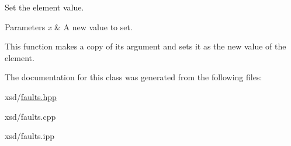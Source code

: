 Set the element value. 


\begin{DoxyParams}{Parameters}
{\em x} & A new value to set.\\
\hline
\end{DoxyParams}
This function makes a copy of its argument and sets it as the new value of the element. 

The documentation for this class was generated from the following files:\begin{DoxyCompactItemize}
\item 
xsd/\hyperlink{faults_8hpp}{faults.hpp}\item 
xsd/faults.cpp\item 
xsd/faults.ipp\end{DoxyCompactItemize}
